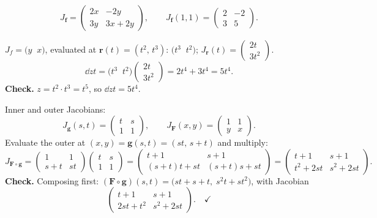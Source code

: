 \begin{solutions}
  \item
        \[
          J_{\mathbf{f}}=\begin{pmatrix}2x&-2y\\3y&3x+2y\end{pmatrix},
          \qquad
          J_{\mathbf{f}}(1,1)=\begin{pmatrix}2&-2\\3&5\end{pmatrix} .
        \]

  \item $J_{f}=\bigl(y\;\;x\bigr)$, evaluated at
        $\mathbf{r}(t)=(t^{2},\,t^{3})$: $\bigl(t^{3}\;\;t^{2}\bigr)$;
        $J_{\mathbf{r}}(t)=\begin{pmatrix}2t\\3t^{2}\end{pmatrix}$.
        \[
          \dd{z}{t}=\bigl(t^{3}\;\;t^{2}\bigr)
            \begin{pmatrix}2t\\3t^{2}\end{pmatrix}
            =2t^{4}+3t^{4}=5t^{4} .
        \]
        \textbf{Check.} $z=t^{2}\cdot t^{3}=t^{5}$, so
        $\dd{z}{t}=5t^{4}$. \checkmark

  \item Inner and outer Jacobians:
        \[
          J_{\mathbf{g}}(s,t)=\begin{pmatrix}t&s\\1&1\end{pmatrix},\qquad
          J_{\mathbf{F}}(x,y)=\begin{pmatrix}1&1\\y&x\end{pmatrix} .
        \]
        Evaluate the outer at $(x,y)=\mathbf{g}(s,t)=(st,\,s+t)$ and
        multiply:
        \[
          J_{\mathbf{F}\circ\mathbf{g}}
            =\begin{pmatrix}1&1\\s+t&st\end{pmatrix}
             \begin{pmatrix}t&s\\1&1\end{pmatrix}
            =\begin{pmatrix}t+1&s+1\\
              (s+t)t+st&(s+t)s+st\end{pmatrix}
            =\begin{pmatrix}t+1&s+1\\
              t^{2}+2st&s^{2}+2st\end{pmatrix} .
        \]
        \textbf{Check.} Composing first:
        $(\mathbf{F}\circ\mathbf{g})(s,t)
        =\bigl(st+s+t,\;s^{2}t+st^{2}\bigr)$, with Jacobian
        \[
          \begin{pmatrix}t+1&s+1\\2st+t^{2}&s^{2}+2st\end{pmatrix} .
          \quad\checkmark
        \]


\end{solutions}

